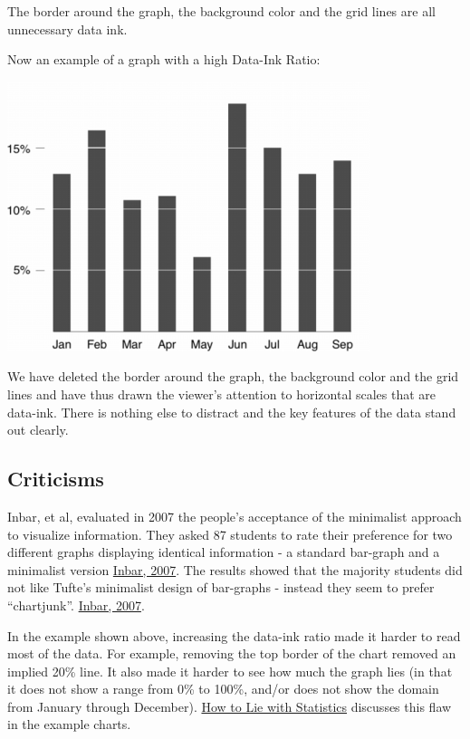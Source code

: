 \documentclass[]{book}
\theoremstyle{definition}
\theoremstyle{definition}
\theoremstyle{definition}
\theoremstyle{remark}
\begin{document}
The border around the graph, the background color and the grid lines are
all unnecessary data ink.

Now an example of a graph with a high Data-Ink Ratio:

\includegraphics{imgs/high_data_ink_ratio.png}

We have deleted the border around the graph, the background color and
the grid lines and have thus drawn the viewer's attention to horizontal
scales that are data-ink. There is nothing else to distract and the key
features of the data stand out clearly.

\hypertarget{criticisms}{%
\subsection{Criticisms}\label{criticisms}}

Inbar, et al, evaluated in 2007 the people's acceptance of the
minimalist approach to visualize information. They asked 87 students to
rate their preference for two different graphs displaying identical
information - a standard bar-graph and a minimalist version
\href{http://portal.acm.org/citation.cfm?id=1362587}{Inbar, 2007}. The
results showed that the majority students did not like Tufte's
minimalist design of bar-graphs - instead they seem to prefer
``chartjunk''.
\href{http://portal.acm.org/citation.cfm?id=1362587}{Inbar, 2007}.

In the example shown above, increasing the data-ink ratio made it harder
to read most of the data. For example, removing the top border of the
chart removed an implied 20\% line. It also made it harder to see how
much the graph lies (in that it does not show a range from 0\% to 100\%,
and/or does not show the domain from January through December).
\href{https://www.librarysearch.manchester.ac.uk/primo-explore/fulldisplay?docid=44MAN_ALMA_DS21134626320001631\&context=L\&vid=MU_NUI\&search_scope=BLENDED\&isFrbr=true\&tab=local\&lang=en_US}{How
to Lie with Statistics} discusses this flaw in the example charts.
\end{document}

